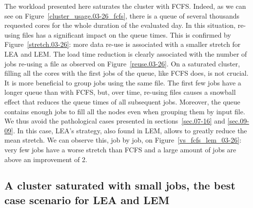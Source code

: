 \documentclass[conference,10pt]{IEEEtran}
\begin{document}
The workload presented here saturates the cluster with FCFS. 
Indeed, as we can see on Figure~\ref{cluster_usage.03-26_fcfs}, there is
a queue of several thousands requested cores
for the whole duration of the evaluated day.
In this situation, re-using files has a significant impact
on the queue times. This is confirmed by Figure~\ref{stretch.03-26}:
more data re-use is associated with a smaller stretch for LEA and LEM.
The load time reduction is clearly associated with the number of jobs re-using a file
as observed on Figure~\ref{reuse.03-26}.
On a saturated cluster, filling all the cores with the first jobs of the queue, like FCFS does, is not crucial.
It is more beneficial to group jobs using the same file.
The first few jobs have a longer queue than with FCFS,
but, over time, re-using files causes a snowball effect that reduces the 
queue times of all subsequent jobs.
Moreover, the queue contains enough jobs to fill all the nodes even when grouping them by input file.
We thus avoid the pathological cases presented in sections~\ref{sec.07-16} and \ref{sec.09-09}.
In this case, LEA's strategy, also found in LEM, allows to greatly reduce the mean stretch.
We can observe this, job by job, on Figure~\ref{vs_fcfs_lem_03-26}: very few jobs 
have a worse stretch than FCFS and a large amount of jobs are above an improvement of 2. 

\subsection{A cluster saturated with small jobs, the best case scenario for LEA and LEM}\label{sec.08-16}
\end{document}
